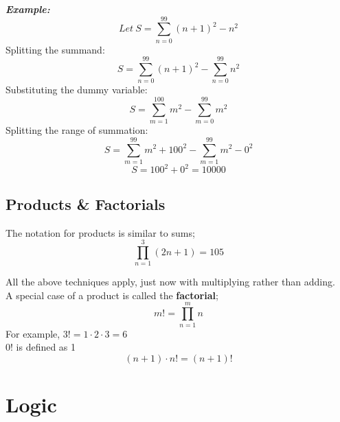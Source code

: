 \documentclass{report}
\newenvironment{frameblack}[1][Black]
  {\begin{tcolorbox}[colframe=#1,colback=white]}
  {\end{tcolorbox}}
\begin{document}
\begin{frameblack}
    \textit{\textbf{Example:}}\\
    \begin{equation*}
        Let \: S = \sum_{n=0}^{99} (n+1)^2 - n^2
    \end{equation*}
    Splitting the summand:
    \begin{equation*}
        S = \sum_{n=0}^{99} (n+1)^2 - \sum_{n=0}^{99} n^2
    \end{equation*}
    Substituting the dummy variable:
    \begin{equation*}
        S = \sum_{m=1}^{100} m^2 - \sum_{m=0}^{99} m^2
    \end{equation*}
    Splitting the range of summation:
    \begin{equation*}
        S = \sum_{m=1}^{99} m^2 + 100^2 - \sum_{m=1}^{99} m^2 - 0^2
    \end{equation*}
    \begin{equation*}
        S = 100^2 + 0^2 = 10000
    \end{equation*}
\end{frameblack}

\section{Products \& Factorials}

The notation for products is similar to sums;
\begin{equation*}
    \prod_{n=1}^3 (2n+1) = 105
\end{equation*}

All the above techniques apply, just now with multiplying rather than adding.\\

A special case of a product is called the \textbf{factorial};
\begin{equation*}
    m! = \prod_{n=1}^m n
\end{equation*}
For example, $3! = 1 \cdot 2 \cdot 3 = 6$\\
$0!$ is defined as 1
\begin{equation*}
    (n+1) \cdot n! = (n+1)!
\end{equation*}

\chapter{Logic}
\end{document}
